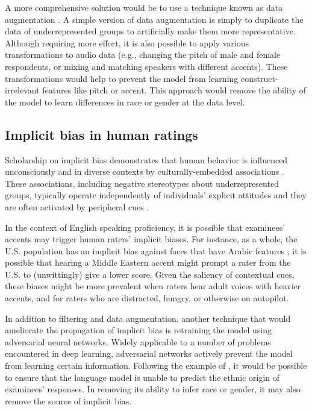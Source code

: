 \documentclass [PhD] {uclathes}
\begin{document}
A more comprehensive solution would be to use a technique known as data augmentation \citep[e.g.][]{zhao2018gender}. A simple version of data augmentation is simply to duplicate the data of underrepresented groups to artificially make them more representative. Although requiring more effort, it is also possible to apply various transformations to audio data (e.g., changing the pitch of male and female respondents, or mixing and matching speakers with different accents). These transformations would help to prevent the model from learning construct-irrelevant features like pitch or accent. This approach would remove the ability of the model to learn differences in race or gender at the data level.

\subsection{Implicit bias in human ratings}

Scholarship on implicit bias demonstrates that human behavior is influenced unconsciously and in diverse contexts by culturally-embedded associations \citep{greenwald2006implicit}. These associations, including negative stereotypes about underrepresented groups, typically operate independently of individuals’ explicit attitudes \citep{karpinski2001attitudes} and they are often activated by peripheral cues \citep{spencer2016}.

In the context of English speaking proficiency, it is possible that examinees’ accents may trigger human raters’ implicit biases. For instance, as a whole, the U.S. population has an implicit bias against faces that have Arabic features \citep{park2007implicit}; it is possible that hearing a Middle Eastern accent might prompt a rater from the U.S. to (unwittingly) give a lower score. Given the saliency of contextual cues, these biases might be more prevalent when raters hear adult voices with heavier accents, and for raters who are distracted, hungry, or otherwise on autopilot.

In addition to filtering and data augmentation, another technique that would ameliorate the propagation of implicit bias is retraining the model using adversarial neural networks. Widely applicable to a number of problems encountered in deep learning, adversarial networks actively prevent the model from learning certain information. Following the example of \citet{zhang2018mitigating}, it would be possible to ensure that the language model is unable to predict the ethnic origin of examinees’ responses. In removing its ability to infer race or gender, it may also remove the source of implicit bias.
\end{document}
